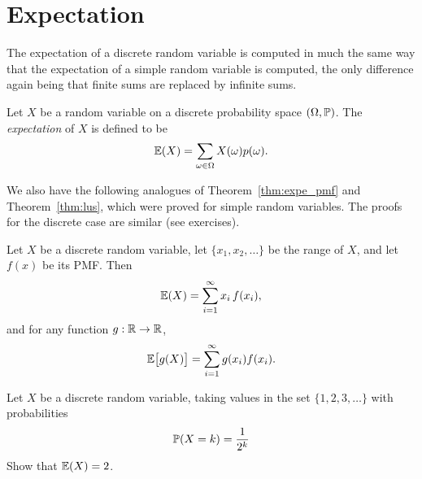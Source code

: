 \section{Expectation}
The expectation of a discrete random variable is computed in much the same way that the expectation of a simple random variable is computed, the only difference again being that finite sums are replaced by infinite sums.

\begin{definition}
Let $X$ be a random variable on a discrete probability space $(\Omega,\mathbb{P})$. 
The \emph{expectation} of $X$ is defined to be
\[
\mathbb{E}(X) = \sum_{\omega\in\Omega} X(\omega)p(\omega).
\]
\end{definition}

We also have the following analogues of Theorem~\ref{thm:expe_pmf} and Theorem~\ref{thm:lus}, which were proved for simple random variables. The proofs for the discrete case are similar (see exercises).
\begin{theorem}
Let $X$ be a discrete random variable, let $\{x_1,x_2,\ldots\}$ be the range of $X$, and let $f(x)$ be its PMF. Then
\[
\mathbb{E}(X) = \sum_{i=1}^{\infty} x_i\,f(x_i),
\]
and for any function $g:\mathbb{R}\to\mathbb{R}$,
\[
\mathbb{E}\big[g(X)\big] = \sum_{i=1}^{\infty} g(x_i)f(x_i).
\]
\end{theorem}



%
\begin{example}
Let $X$ be a discrete random variable, taking values in the set $\{1,2,3,\ldots\}$ with probabilities
\[
\mathbb{P}(X=k) = \frac{1}{2^k}
\]
Show that $\mathbb{E}(X)=2$.
\end{example}

